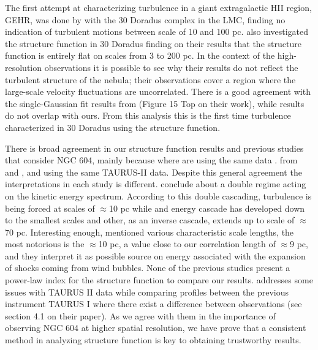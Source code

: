 \documentclass[fleqn,usenatbib, useAMS, a4paper]{mnras}
\begin{document}
The first attempt at characterizing turbulence in a giant extragalactic HII region, GEHR, was done by \citet{1961MNRAS.122....1F} with the 30 Doradus complex in the LMC, finding no indication of turbulent motions between scale of 10 and 100 pc.
\citet{2019arXiv191203543M} also investigated the structure function in 30 Doradus finding on their results that the structure function is entirely flat on scales from 3 to 200 pc.
In the context of the high-resolution observations it is possible to see why their results do not reflect the turbulent structure of the nebula; their observations cover a region where the large-scale velocity fluctuations are uncorrelated.
There is a good agreement with the single-Gaussian fit results from \citet{2019arXiv191203543M} (Figure 15 Top on their work), while \citet{1961MNRAS.122....1F} results do not overlap with ours.
From this analysis this is the first time turbulence characterized in 30 Doradus using the structure function.

There is broad agreement in our structure function results and previous studies that consider NGC 604, mainly because where are using the same data \citep{tanco1997,2019arXiv191203543M}. 
from \citet{tanco1997} and \citet{2019arXiv191203543M}, and using the same TAURUS-II data.
Despite this general agreement the interpretations in each study is different.
\citet{tanco1997} conclude about a double regime acting on the kinetic energy spectrum.
According to this double cascading, turbulence is being forced at scales of \(\approx\)10 pc while and energy cascade has developed down to the smallest scales and other, as an inverse cascade, extends up to scale of \(\approx\)70 pc.
Interesting enough, \citet{tanco1997} mentioned various characteristic scale lengths, the most notorious is the \(\approx\)10 pc, a value close to our correlation length of \(\approx\)9 pc, and they interpret it as possible source on energy associated with the expansion of shocks coming from wind bubbles.  
None of the previous studies present a power-law index for the structure function to compare our results.
\citet{2019arXiv191203543M} addresses some issues with TAURUS II data while comparing profiles between the previous instrument TAURUS I where there exist a difference between observations (see section 4.1 on their paper).
As we agree with them in the importance of observing NGC 604 at higher spatial resolution, we have prove that a consistent method in analyzing structure function is key to obtaining trustworthy results.
\end{document}
